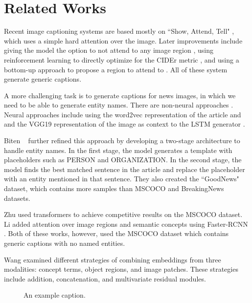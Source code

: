 \documentclass[10pt,twocolumn,letterpaper]{article}
\begin{document}
\section{Related Works}

Recent image captioning systems are based mostly on ``Show, Attend, Tell"
\cite{Xu2015ShowAA}, which uses a simple hard attention over the image. Later
improvements include giving the model the option to not attend to any image
region \cite{Lu2016KnowingWT}, using reinforcement learning to directly
optimize for the CIDEr metric \cite{Rennie2016SelfCriticalST}, and using a
bottom-up approach to propose a region to attend to
\cite{Anderson2017BottomUpAT}. All of these system generate generic captions.

A more challenging task is to generate captions for news images, in which we
need to be able to generate entity names. There are non-neural approaches
\cite{Feng2013AutomaticCG,Tariq2017ACE}. Neural approaches include using the
word2vec representation of the article and and the VGG19 representation of the
image as context to the LSTM generator \cite{Ramisa2016BreakingNewsAA}.

Biten \etal~\cite{Biten2019GoodNews} further refined this approach by
developing a two-stage architecture to handle entity names. In the first stage,
the model generates a template with placeholders such as PERSON and
ORGANIZATION. In the second stage, the model finds the best matched sentence in
the article and replace the placeholder with an entity mentioned in that
sentence. They also created the ``GoodNews" dataset, which contains more
samples than MSCOCO \cite{Lin2014MicrosoftCC} and BreakingNews
\cite{Ramisa2016BreakingNewsAA} datasets.

Zhu \etal \cite{Zhu2018CaptioningTW} used transformers to achieve competitive
results on the MSCOCO dataset. Li \etal \cite{Li2019Boosted} added attention
over image regions and semantic concepts using Faster-RCNN
\cite{Ren2015FasterRCNN}. Both of these works, however, used the MSCOCO dataset
which contains generic captions with no named entities.

Wang \etal \cite{Wang2019Hierarchical} examined different strategies of
combining embeddings from three modalities: concept terms, object regions,
and image patches. These strategies include addition, concatenation, and
multivariate residual modules.

\begin{figure}[t]
   \begin{center}
   \fbox{\rule{0pt}{2in} \rule{0.9\linewidth}{0pt}}
   \end{center}
      \caption{An example caption.}
   \label{fig:long}
   \label{fig:onecol}
   \end{figure}
\end{document}
